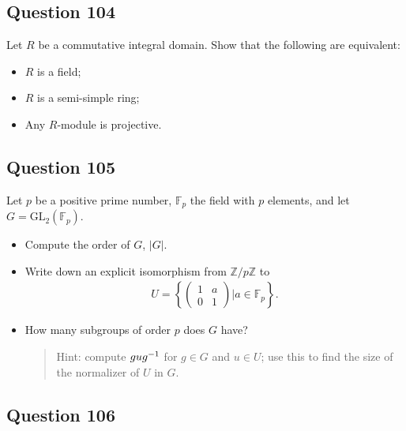 \documentclass[12pt]{article}
\begin{document}
\hypertarget{question-104}{%
\subsection{Question 104}\label{question-104}}

Let \(R\) be a commutative integral domain. Show that the following are
equivalent:

\begin{itemize}
\item
  \(R\) is a field;
\item
  \(R\) is a semi-simple ring;
\item
  Any \(R\)-module is projective.
\end{itemize}

\hypertarget{question-105}{%
\subsection{Question 105}\label{question-105}}

Let \(p\) be a positive prime number, \(\mathbb F_p\) the field with
\(p\) elements, and let \(G=\text{GL}_2(\mathbb F_p)\).

\begin{itemize}
\item
  Compute the order of \(G\), \(|G|\).
\item
  Write down an explicit isomorphism from \(\mathbb Z/p\mathbb Z\) to
  \begin{align*}
  U=\left\{
  \begin{pmatrix}
    1 & a\\
    0 & 1
  \end{pmatrix}
  \bigg|a\in\mathbb F_p\right\}.
  \end{align*}
\item
  How many subgroups of order \(p\) does \(G\) have?

  \begin{quote}
  Hint: compute \(gug^{-1}\) for \(g\in G\) and \(u\in U\); use this to
  find the size of the normalizer of \(U\) in \(G\).
  \end{quote}
\end{itemize}

\hypertarget{question-106}{%
\subsection{Question 106}\label{question-106}}
\end{document}
